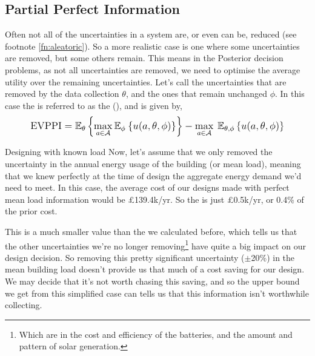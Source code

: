 \subsection{Partial Perfect Information}

Often not all of the uncertainties in a system are, or even can be, reduced (see footnote \ref{fn:aleatoric}). So a more realistic case is one where some uncertainties are removed, but some others remain. This means in the Posterior decision problems, as not all uncertainties are removed, we need to optimise the average utility over the remaining uncertainties. Let's call the uncertainties that are removed by the data collection $\theta$, and the ones that remain unchanged $\phi$. In this case the  is referred to as the  (), and is given by,
\vspace*{-0.1cm}
\begin{equation} \label{eq:evppi}
    \mathlarger{
        \text{EVPPI} =
        \mathbb{E}_{\theta} \left\lbrace \max_{a \in \mathcal{A}} \mathbb{E}_{\phi} \: \lbrace u(a,\theta,\phi) \rbrace \right\rbrace
        - \max_{a \in \mathcal{A}} \: \mathbb{E}_{\theta,\phi} \left\lbrace u(a,\theta,\phi) \right\rbrace
    }
\end{equation}
\vspace{-0.6cm}

\begin{ebox}[label=ebox:evppi]{Designing with known load}
    Now, let's assume that we only removed the uncertainty in the annual energy usage of the building (or mean load), meaning that we knew perfectly at the time of design the aggregate energy demand we'd need to meet. In this case, the average cost of our designs made with perfect mean load information would be £139.4k/yr. So the  is just £0.5k/yr, or 0.4\% of the prior cost.

    This is a much smaller value than the  we calculated before, which tells us that the other uncertainties we're no longer removing\footnote{Which are in the cost and efficiency of the batteries, and the amount and pattern of solar generation.} have quite a big impact on our design decision. So removing this pretty significant uncertainty ($\pm$20\%) in the mean building load doesn't provide us that much of a cost saving for our design. We may decide that it's not worth chasing this saving, and so the upper bound we get from this simplified case can tells us that this information isn't worthwhile collecting.
\end{ebox}


